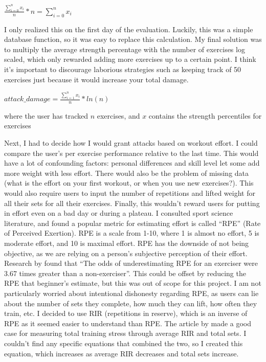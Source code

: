 \documentclass{l4proj}
\begin{document}
\begin{algorithm}[H]
  $\frac{\sum_{i=0}^{n} x_i}{n} * n = {\sum_{i=0}^{n} x_i}$
\end{algorithm}

I only realized this on the first day of the evaluation. Luckily, this was a simple database function, so it was easy to replace this calculation. 
My final solution was to multiply the average strength percentage with the number of exercises log scaled, which only rewarded adding more exercises up to a certain point. I think it's important to discourage laborious strategies such as keeping track of 50 exercises just because it would increase your total damage. 

\begin{algorithm}
  $attack\_damage = \frac{\sum_{i=1}^{n} x_i}{n} * ln(n) $

  where the user has tracked $n$ exercises, and $x$ contains the strength percentiles for exercises 
\end{algorithm}

Next, I had to decide how I would grant attacks based on workout effort. I could compare the user's per exercise performance relative to the last time. This would have a lot of confounding factors: personal differences and skill level let some add more weight with less effort. There would also be the problem of missing data (what is the effort on your first workout, or when you use new exercises?). This would also require users to input the number of repetitions and lifted weight for all their sets for all their exercises. Finally, this wouldn't reward users for putting in effort even on a bad day or during a plateau. I consulted sport science literature, and found a popular metric for estimating effort is called ``RPE'' (Rate of Perceived Exertion). RPE is a scale from 1-10, where 1 is almost no effort, 5 is moderate effort, and 10 is maximal effort. RPE has the downside of not being objective, as we are relying on a person's subjective perception of their effort. Research by \citet{RPE_estimations} found that ``The odds of underestimating RPE for an exerciser were 3.67 times greater than a non-exerciser''. This could be offset by reducing the RPE that beginner's estimate, but this was out of scope for this project. I am not particularly worried about intentional dishonesty regarding RPE, as users can lie about the number of sets they complete, how much they can lift, how often they train, etc. I decided to use RIR (repetitions in reserve), which is an inverse of RPE as it seemed easier to understand than RPE. The article by \citet{rir} made a good case for measuring total training stress through average RIR and total sets. I couldn't find any specific equations that combined the two, so I created this equation, which increases as average RIR decreases and total sets increase.
\end{document}

